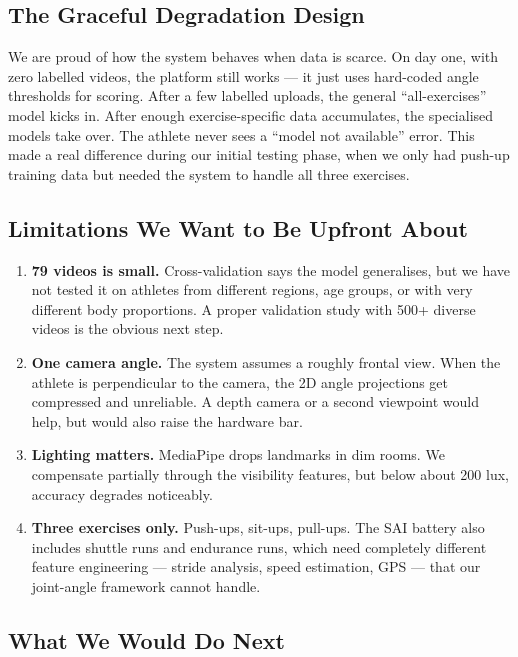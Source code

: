 \documentclass[conference]{IEEEtran}
\begin{document}
\subsection{The Graceful Degradation Design}
We are proud of how the system behaves when data is scarce. On day one, with zero labelled videos, the platform still works --- it just uses hard-coded angle thresholds for scoring. After a few labelled uploads, the general ``all-exercises'' model kicks in. After enough exercise-specific data accumulates, the specialised models take over. The athlete never sees a ``model not available'' error. This made a real difference during our initial testing phase, when we only had push-up training data but needed the system to handle all three exercises.

\subsection{Limitations We Want to Be Upfront About}

\begin{enumerate}
    \item \textbf{79 videos is small.} Cross-validation says the model generalises, but we have not tested it on athletes from different regions, age groups, or with very different body proportions. A proper validation study with 500+ diverse videos is the obvious next step.
    \item \textbf{One camera angle.} The system assumes a roughly frontal view. When the athlete is perpendicular to the camera, the 2D angle projections get compressed and unreliable. A depth camera or a second viewpoint would help, but would also raise the hardware bar.
    \item \textbf{Lighting matters.} MediaPipe drops landmarks in dim rooms. We compensate partially through the visibility features, but below about 200 lux, accuracy degrades noticeably.
    \item \textbf{Three exercises only.} Push-ups, sit-ups, pull-ups. The SAI battery also includes shuttle runs and endurance runs, which need completely different feature engineering --- stride analysis, speed estimation, GPS --- that our joint-angle framework cannot handle.
\end{enumerate}

\subsection{What We Would Do Next}
\end{document}
